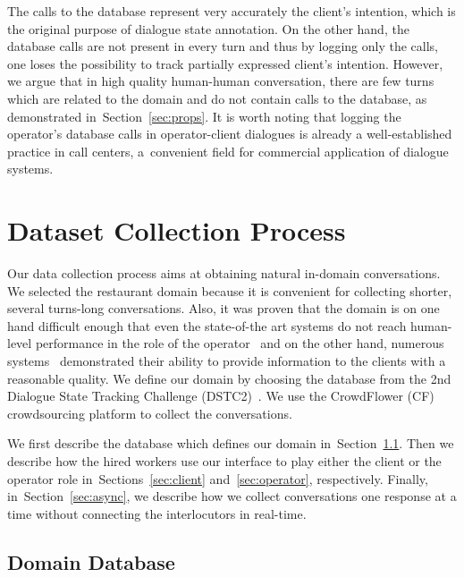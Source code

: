 \documentclass[runningheads,a4paper]{llncs}
\begin{document}
The calls to the database represent very accurately the client's intention, which is the original purpose of dialogue state annotation.
On the other hand, the database calls are not present in every turn and thus by logging only the calls, one loses the possibility to track partially expressed client's intention.
However, we argue that in high quality human-human conversation, there are few turns which are related to the domain and do not contain calls to the database, as demonstrated in~Section~\ref{sec:props}.
It is worth noting that logging the operator's database calls in operator-client dialogues is already a well-established practice in call centers, a~convenient field for commercial application of dialogue systems.

\section{Dataset Collection Process} \label{sec:collection}
\vspace{-0.50em}
Our data collection process aims at obtaining natural in-domain conversations.
We selected the restaurant domain because it is convenient for collecting shorter, several turns-long conversations.
Also, it was proven that the domain is on one hand difficult enough that even the state-of-the art systems do not reach human-level performance in the role of the operator~\cite{henderson2014dstc2} and on the other hand, numerous systems~\cite{young2010hidden,gasic2011line,wen2016network} demonstrated their ability to provide information to the clients with a reasonable quality.
We define our domain by choosing the database from the 2nd Dialogue State Tracking Challenge (DSTC2)~\cite{henderson2014dstc2}.
We use the CrowdFlower (CF) crowdsourcing platform to collect the conversations.

We first describe the database which defines our domain in~Section~\ref{sec:db}.
Then we describe how the hired workers use our interface to play either the client or the operator role in~Sections~\ref{sec:client} and~\ref{sec:operator}, respectively.
Finally, in~Section~\ref{sec:async}, we describe how we collect conversations one response at a time without connecting the interlocutors in real-time. 

\vspace{-1.00em}
\subsection{Domain Database}
\label{sec:db}
\end{document}

